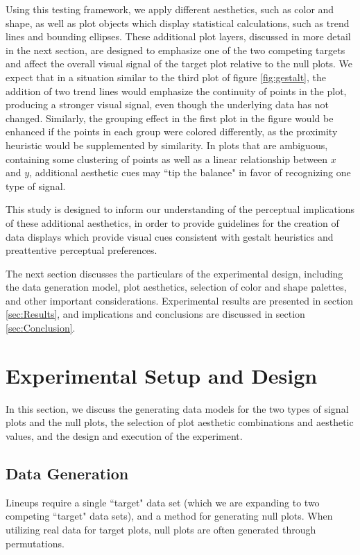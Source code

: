 \documentclass[11pt]{isuthesis}\usepackage[]{graphicx}\usepackage[]{color}
\begin{document}
Using this testing framework, we  apply different aesthetics, such as color and shape, as well as plot objects which display statistical calculations, such as trend lines and bounding ellipses. These additional plot layers, discussed in more detail in the next section, are designed to emphasize one of the two competing targets and affect the overall visual signal of the target plot relative to the null plots. We expect that in a situation similar to the third plot of figure \ref{fig:gestalt}, the addition of two trend lines would emphasize the continuity of points in the plot, producing a stronger visual signal, even though the underlying data has not changed. Similarly, the grouping effect in the first plot in the figure would be enhanced if the points in each group were colored differently, as the proximity heuristic would be supplemented by similarity. In plots that are ambiguous, containing some clustering of points as well as a linear relationship between $x$ and $y$, additional aesthetic cues may ``tip the balance" in favor of recognizing one type of signal.

This study is designed to inform our understanding of the perceptual implications of these additional aesthetics, in order to provide guidelines for the creation of data displays which provide visual cues consistent with gestalt heuristics and preattentive perceptual preferences. 

The next section discusses the particulars of the experimental design, including the data generation model, plot aesthetics, selection of color and shape palettes, and other important considerations. Experimental results are presented in section \ref{sec:Results}, and implications and conclusions are discussed in section \ref{sec:Conclusion}. 

\section{Experimental Setup and Design} \label{sec:ExperimentalDesign}
In this section, we discuss the generating data models for the two types of signal plots and the null plots, the selection of plot aesthetic combinations and aesthetic values, and the design and execution of the experiment.

\subsection{Data Generation}
Lineups require a single ``target" data set (which we are expanding to two competing ``target" data sets), and a method for generating null plots. When utilizing real data for target plots, null plots are often generated through permutations.
\end{document}
